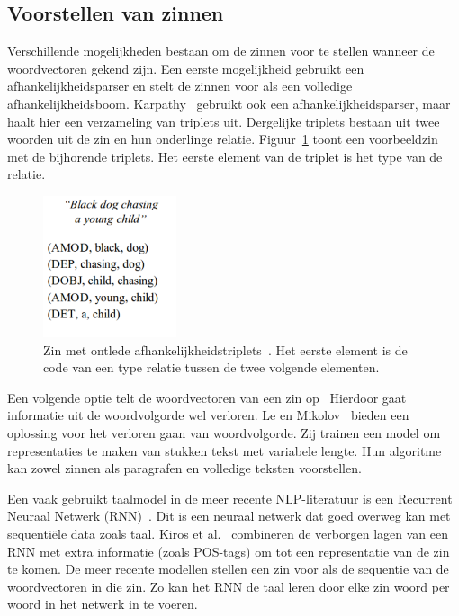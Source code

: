\subsection{Voorstellen van zinnen}
 Verschillende mogelijkheden bestaan om de zinnen voor te stellen wanneer de woordvectoren gekend zijn. Een eerste mogelijkheid gebruikt een afhankelijkheidsparser en stelt de zinnen voor als een volledige afhankelijkheidsboom\cite{Socher2014}. Karpathy~\cite{Karpathy2014} gebruikt ook een afhankelijkheidsparser, maar haalt hier een verzameling van triplets uit. Dergelijke triplets bestaan uit twee woorden uit de zin en hun onderlinge relatie. Figuur~\ref{fig:deprelations} toont een voorbeeldzin met de bijhorende triplets. Het eerste element van de triplet is het type van de relatie.

 \begin{figure}[tb]
     \centering
     \includegraphics[width=0.35\textwidth]{Images/dep_relations}
     \caption{Zin met ontlede afhankelijkheidstriplets~\cite{Karpathy2014}. Het eerste element is de code van een type relatie tussen de twee volgende elementen.}
     \label{fig:deprelations}
 \end{figure}

 Een volgende optie telt de woordvectoren van een zin op~\cite{Lebret2013}  Hierdoor gaat informatie uit de woordvolgorde wel verloren. Le en Mikolov~\cite{Le2014a} bieden een oplossing voor het verloren gaan van woordvolgorde. Zij trainen een model om representaties te maken van stukken tekst met variabele lengte. Hun algoritme kan zowel zinnen als paragrafen en volledige teksten voorstellen.

 Een vaak gebruikt taalmodel in de meer recente NLP-literatuur is een Recurrent Neuraal Netwerk (RNN)~\cite{Mikolov2010}. Dit is een neuraal netwerk dat goed overweg kan met sequenti\"ele data zoals taal. Kiros et al.~\cite{Kiros2013} combineren de verborgen lagen van een RNN met extra informatie (zoals POS-tags) om tot een representatie van de zin te komen. De meer recente modellen stellen een zin voor als de sequentie van de woordvectoren in die zin. Zo kan het RNN de taal leren door elke zin woord per woord in het netwerk in te voeren.
 
